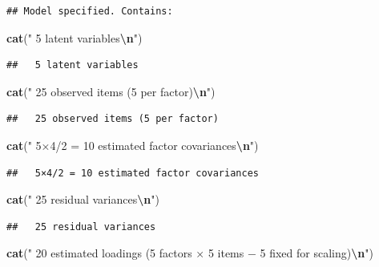 \documentclass[
]{article}
\newenvironment{Shaded}{\begin{snugshade}}{\end{snugshade}}
\newcommand{\FunctionTok}[1]{\textcolor[rgb]{0.13,0.29,0.53}{\textbf{#1}}}
\newcommand{\NormalTok}[1]{#1}
\newcommand{\SpecialCharTok}[1]{\textcolor[rgb]{0.81,0.36,0.00}{\textbf{#1}}}
\newcommand{\StringTok}[1]{\textcolor[rgb]{0.31,0.60,0.02}{#1}}
\begin{document}
\begin{verbatim}
## Model specified. Contains:
\end{verbatim}

\begin{Shaded}
\begin{Highlighting}[]
\FunctionTok{cat}\NormalTok{(}\StringTok{"  5 latent variables}\SpecialCharTok{\textbackslash{}n}\StringTok{"}\NormalTok{)}
\end{Highlighting}
\end{Shaded}

\begin{verbatim}
##   5 latent variables
\end{verbatim}

\begin{Shaded}
\begin{Highlighting}[]
\FunctionTok{cat}\NormalTok{(}\StringTok{"  25 observed items (5 per factor)}\SpecialCharTok{\textbackslash{}n}\StringTok{"}\NormalTok{)}
\end{Highlighting}
\end{Shaded}

\begin{verbatim}
##   25 observed items (5 per factor)
\end{verbatim}

\begin{Shaded}
\begin{Highlighting}[]
\FunctionTok{cat}\NormalTok{(}\StringTok{"  5×4/2 = 10 estimated factor covariances}\SpecialCharTok{\textbackslash{}n}\StringTok{"}\NormalTok{)}
\end{Highlighting}
\end{Shaded}

\begin{verbatim}
##   5×4/2 = 10 estimated factor covariances
\end{verbatim}

\begin{Shaded}
\begin{Highlighting}[]
\FunctionTok{cat}\NormalTok{(}\StringTok{"  25 residual variances}\SpecialCharTok{\textbackslash{}n}\StringTok{"}\NormalTok{)}
\end{Highlighting}
\end{Shaded}

\begin{verbatim}
##   25 residual variances
\end{verbatim}

\begin{Shaded}
\begin{Highlighting}[]
\FunctionTok{cat}\NormalTok{(}\StringTok{"  20 estimated loadings (5 factors × 5 items − 5 fixed for scaling)}\SpecialCharTok{\textbackslash{}n}\StringTok{"}\NormalTok{)}
\end{Highlighting}
\end{Shaded}
\end{document}
